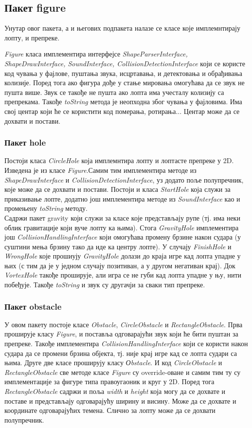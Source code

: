 \subsection{Пакет figure}
Унутар овог пакета, а и његових подпакета налазе се класе које имплемнтирају лопту, и препреке. 

\emph{Figure} класа имплементира интерфејсе \emph{ShapeParserInterface, ShapeDrawInterface, SoundInterface, CollisionDetectionInterface} који се користе код чувања у фајлове, пуштања звука, исцртавања, и детектовања и обрађивања колизије. Поред тога ако фигура дође у стање мировања омогућава да се звук не пушта више. Звук се такође не пушта ако лопта има учесталу колизију са препрекама. Такође \emph{toString} метода је неопходна због чувања у фајловима. Има  свој центар који ће се користити код померања, ротирања... Центар може да се дохвати и постави.


\subsubsection{Пакет hole}
Постоји класа \emph{CircleHole} која имплемнтира лопту и лоптасте препреке у 2D. Изведена је из класе \emph{Figure}.Самим тим имплементира методе из \emph{ShapeDrawInterface} и \emph{CollisionDetectionInterface}, уз додато поље полупречник, које може да се дохвати и постави.
Постоји и класа \emph{StartHole} која служи за приказивање лопте, додатно још имплементира методе из \emph{SoundInterface} као и промењену \emph{toString} методу. 
\\ \indent Садржи  пакет gravity који служи за класе које представљају рупе (тј. има неки облик гравитације који вуче лопту ка њима). Стога \emph{ GravityHole} имплементира још \emph{CollisionHandlingInterface} који омогућава промену брзине након судара (у суштини мења брзину тако да иде ка центру лопте). У случају \emph{FinishHole} и \emph{WrongHole} које прошиују \emph{GravityHole} долази до краја игре кад лопта упадне у њих (с тим да је у једном случају позитиван, а у другом негативан крај). Док \emph{VortexHole} такође проширује, али игра се не губи кад лопта упадне у њу, нити побеђује. Такође \emph{toString} и звук су другачји за сваки тип препреке.
\subsubsection{Пакет obstacle}
У овом пакету постоје класе \emph{Obstacle}, \emph{CircleObstacle} и \emph{RectangleObstacle}. Прва проширује класу \emph{Figure}, и поставља одговарајући звук који ће бити пуштан за препреке. Такође имплементира \emph{CollisionHandlingInterface} који се користи након судара да се промени брзина објекта, тј. није крај игре кад се лопта судари са њима. Друге две класе проширују класу \emph{Оbstacle}. И код \emph{CircleObstacle} и \emph{RectangleObstacle} све методе класе \emph{Figure} су override-оване и самим тим ту су имплементације за фигуре типа правоугаоник и круг у 2D. Поред тога \emph{RectangleObstacle} садржи и поља \emph{width} и \emph{height} која могу да се дохвате и поставе и представљају одговарајућу ширину и висину. Може да се дохвате и координате одговарајућих темена. Слично за лопту може да се дохвати полупречник.

